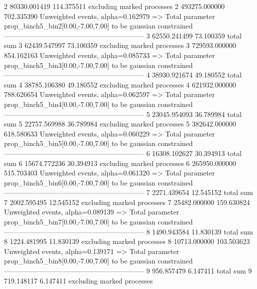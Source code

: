 2          80330.001419    114.375511      excluding marked processes    
2          493275.000000   702.335390      Unweighted events, alpha=0.162979
  => Total parameter prop_binch5_bin2[0.00,-7.00,7.00] to be gaussian constrained
------------------------------------------------------------
3          62550.241499    73.100359       total sum                     
3          62439.547997    73.100359       excluding marked processes    
3          729593.000000   854.162163      Unweighted events, alpha=0.085733
  => Total parameter prop_binch5_bin3[0.00,-7.00,7.00] to be gaussian constrained
------------------------------------------------------------
4          38930.921674    49.180552       total sum                     
4          38785.106380    49.180552       excluding marked processes    
4          621932.000000   788.626654      Unweighted events, alpha=0.062597
  => Total parameter prop_binch5_bin4[0.00,-7.00,7.00] to be gaussian constrained
------------------------------------------------------------
5          23045.954093    36.789984       total sum                     
5          22757.569988    36.789984       excluding marked processes    
5          382642.000000   618.580633      Unweighted events, alpha=0.060229
  => Total parameter prop_binch5_bin5[0.00,-7.00,7.00] to be gaussian constrained
------------------------------------------------------------
6          16308.102627    30.394913       total sum                     
6          15674.772236    30.394913       excluding marked processes    
6          265950.000000   515.703403      Unweighted events, alpha=0.061320
  => Total parameter prop_binch5_bin6[0.00,-7.00,7.00] to be gaussian constrained
------------------------------------------------------------
7          2271.439654     12.545152       total sum                     
7          2002.595495     12.545152       excluding marked processes    
7          25482.000000    159.630824      Unweighted events, alpha=0.089139
  => Total parameter prop_binch5_bin7[0.00,-7.00,7.00] to be gaussian constrained
------------------------------------------------------------
8          1490.943584     11.830139       total sum                     
8          1224.481995     11.830139       excluding marked processes    
8          10713.000000    103.503623      Unweighted events, alpha=0.139171
  => Total parameter prop_binch5_bin8[0.00,-7.00,7.00] to be gaussian constrained
------------------------------------------------------------
9          956.857479      6.147411        total sum                     
9          719.148117      6.147411        excluding marked processes    
